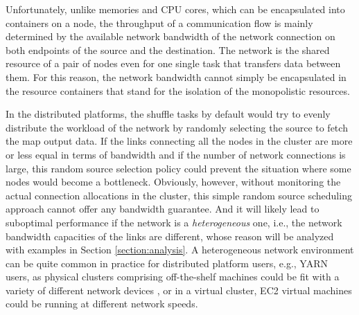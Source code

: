 \documentclass[10pt,journal,compsoc]{IEEEtran}
\begin{document}
Unfortunately, unlike memories and CPU cores, which can be encapsulated into containers on a node, the throughput
of a communication flow is mainly determined by the available network bandwidth of 
the network connection on both endpoints of the source and the destination.  
The network is the shared resource of a pair of nodes even for one single task that transfers data between them. 
For this reason, the network bandwidth cannot simply be encapsulated in the resource containers that stand for the isolation of the monopolistic resources.

In the distributed platforms, the shuffle tasks by default
would try to evenly distribute the workload of the network
by randomly selecting the source to fetch the map output data. 
If the links connecting all the nodes in the cluster
are more or less equal in terms of bandwidth
and if the number of network connections is
large, this random source selection policy could prevent the situation
where some nodes would become a bottleneck.
Obviously, however, without monitoring the actual connection
allocations %
in the cluster, this simple random source scheduling approach cannot offer
any bandwidth guarantee. 
And it will likely lead to suboptimal performance
if the network is a \emph{heterogeneous} one,
i.e., the network bandwidth capacities of the links are different, 
whose reason will be analyzed with examples in Section \ref{section:analysis}.
A heterogeneous network environment can be quite common in practice
for distributed platform users, e.g., YARN users, as physical clusters comprising off-the-shelf
machines could be fit with a variety of different network devices \cite{zaharia2008improving}, 
or in a virtual cluster, EC2 virtual machines could be running at
different network speeds. %
\end{document}
